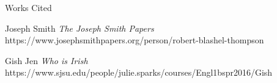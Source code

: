 \documentclass[12pt]{article}
\newcommand{\bibent}{\noindent \hangindent 40pt}
\newenvironment{workscited}{\newpage \begin{center} Works Cited \end{center}}{\newpage }
\begin{document}
\begin{flushleft}
\newpage


%
%
%
%
%
%
%

\begin{workscited}


\bibent
Joseph Smith \textit{The Joseph Smith Papers}
https://www.josephsmithpapers.org/person/robert-blashel-thompson

Gish Jen \textit{Who is Irish}
https://www.sjsu.edu/people/julie.sparks/courses/Engl1bspr2016/Gish%

\end{workscited}

\end{flushleft}
\end{document}
